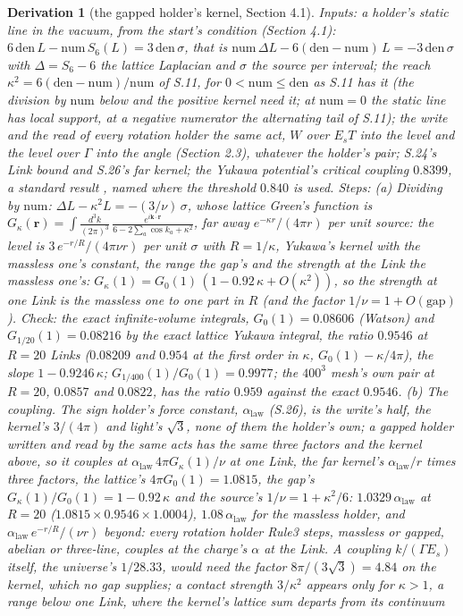 \documentclass[pdflatex,sn-mathphys-num]{sn-jnl}
\newcommand{\num}{\mathrm{num}}
\newcommand{\den}{\mathrm{den}}
\theoremstyle{thmstyleone}
\newtheorem{derivation}{Derivation}
\begin{document}
\begin{derivation}[the gapped holder's kernel, Section 4.1]
\emph{Inputs:} a holder's static line in the vacuum, from the start's condition (Section 4.1): $6\,\den\,L - \num\,S_6(L) = 3\,\den\,\sigma$, that is $\num\,\Delta L - 6(\den - \num)\,L = -3\,\den\,\sigma$ with $\Delta = S_6 - 6$ the lattice Laplacian and $\sigma$ the source per interval; the reach $\kappa^2 = 6(\den - \num) / \num$ of S.11, for $0 < \num \le \den$ as S.11 has it (the division by $\num$ below and the positive kernel need it; at $\num = 0$ the static line has local support, at a negative numerator the alternating tail of S.11); the write and the read of every rotation holder the same act, $W$ over $E_s T$ into the level and the level over $\Gamma$ into the angle (Section 2.3), whatever the holder's pair; S.24's Link bound and S.26's far kernel; the Yukawa potential's critical coupling $0.8399$, a standard result \cite{rogers1970}, named where the threshold $0.840$ is used. \emph{Steps:} (a) Dividing by $\num$: $\Delta L - \kappa^2 L = -(3 / \nu)\,\sigma$, whose lattice Green's function is $G_\kappa(\mathbf r) = \int \frac{d^3k}{(2\pi)^3}\,\frac{e^{i\mathbf k\cdot\mathbf r}}{6 - 2\sum_a\cos k_a + \kappa^2}$, far away $e^{-\kappa r} / (4\pi r)$ per unit source: the level is $3\,e^{-r / R} / (4\pi\nu r)$ per unit $\sigma$ with $R = 1 / \kappa$, Yukawa's kernel with the massless one's constant, the range the gap's and the strength at the Link the massless one's: $G_\kappa(1) = G_0(1)\,(1 - 0.92\,\kappa + O(\kappa^2))$, so the strength at one Link is the massless one to one part in $R$ (and the factor $1 / \nu = 1 + O(\text{gap})$). \emph{Check:} the exact infinite-volume integrals, $G_0(1) = 0.08606$ (Watson) and $G_{1/20}(1) = 0.08216$ by the exact lattice Yukawa integral, the ratio $0.9546$ at $R = 20$ Links ($0.08209$ and $0.954$ at the first order in $\kappa$, $G_0(1) - \kappa / 4\pi$), the slope $1 - 0.9246\,\kappa$; $G_{1/400}(1) / G_0(1) = 0.9977$; the $400^3$ mesh's own pair at $R = 20$, $0.0857$ and $0.0822$, has the ratio $0.959$ against the exact $0.9546$. (b) \emph{The coupling.} The sign holder's force constant, $\alpha_{\mathrm{law}}$ (S.26), is the write's half, the kernel's $3 / (4\pi)$ and light's $\sqrt 3$, none of them the holder's own; a gapped holder written and read by the same acts has the same three factors and the kernel above, so it couples at $\alpha_{\mathrm{law}}\,4\pi G_\kappa(1) / \nu$ at one Link, the far kernel's $\alpha_{\mathrm{law}} / r$ times three factors, the lattice's $4\pi G_0(1) = 1.0815$, the gap's $G_\kappa(1) / G_0(1) = 1 - 0.92\,\kappa$ and the source's $1 / \nu = 1 + \kappa^2 / 6$: $1.0329\,\alpha_{\mathrm{law}}$ at $R = 20$ ($1.0815 \times 0.9546 \times 1.0004$), $1.08\,\alpha_{\mathrm{law}}$ for the massless holder, and $\alpha_{\mathrm{law}}\,e^{-r / R} / (\nu r)$ beyond: every rotation holder Rule3 steps, massless or gapped, abelian or three-line, couples at the charge's $\alpha$ at the Link. A coupling $k / (\Gamma E_s)$ itself, the universe's $1 / 28.33$, would need the factor $8\pi / (3\sqrt 3) = 4.84$ on the kernel, which no gap supplies; a contact strength $3 / \kappa^2$ appears only for $\kappa > 1$, a range below one Link, where the kernel's lattice sum departs from its continuum 
\end{derivation}
\end{document}
